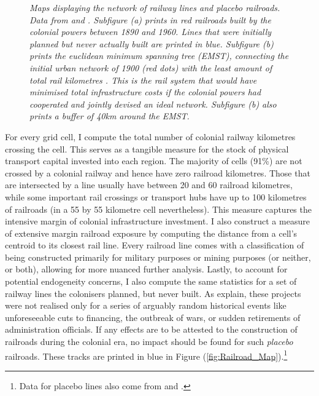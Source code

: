 \documentclass[11pt, oneside]{article}   	%
\let\oldref\ref
\renewcommand{\ref}[1]{(\oldref{#1})}
\newcommand{\mysubcaption}[1]{
\justify
\begin{spacing}{0.7}
\textit{\footnotesize #1}
\end{spacing}}
\begin{document}
\begin{figure}
\label{fig:Rail Maps}
\mysubcaption{Maps displaying the network of railway lines and placebo railroads. Data from \cite{Jedwab_PermanentEffectsTransportation_2016a} and \cite{Herranz-Loncan_publicbenefitRailways_2017}. Subfigure (a) prints in red  railroads built by the colonial powers between 1890 and 1960. Lines that were initially planned but never actually built are printed in blue. Subfigure (b) prints the euclidean minimum spanning tree (EMST), connecting the initial urban network of 1900 (red dots) with the least amount of total rail kilometres \citep[see ][]{Jedwab_PermanentEffectsTransportation_2016a}. This is the rail system that would have minimised total infrastructure costs if the colonial powers had cooperated and jointly devised an ideal network. Subfigure (b) also prints a buffer of 40km around the EMST.}
\end{figure}

For every grid cell, I compute the total number of colonial railway kilometres crossing the cell. This serves as a tangible measure for the stock of physical transport capital invested into each region. The majority of cells (91\%) are not crossed by a colonial railway and hence have zero railroad kilometres. Those that are intersected by a line usually have between 20 and 60 railroad kilometres, while some important rail crossings or transport hubs have up to 100 kilometres of railroads (in a 55 by 55 kilometre cell nevertheless). This measure captures the intensive margin of colonial infrastructure investment. I also construct a measure of extensive margin railroad exposure by computing the distance from a cell's centroid to its closest rail line. Every railroad line comes with a classification of being constructed primarily for military purposes or mining purposes (or neither, or both), allowing for more nuanced further analysis. Lastly, to account for potential endogeneity concerns, I also compute the same statistics for a set of railway lines the colonisers planned, but never built. As \cite{Jedwab_PermanentEffectsTransportation_2016a} explain, these projects were not realised only for a series of arguably random historical events like unforeseeable cuts to financing, the outbreak of wars, or sudden retirements of administration officials. If any effects are to be attested to the construction of railroads during the colonial era, no impact should be found for such \emph{placebo} railroads. These tracks are printed in blue in Figure \ref{fig:Railroad_Map}.\footnote{Data for placebo lines also come from \cite{Jedwab_PermanentEffectsTransportation_2016a} and \cite{Herranz-Loncan_publicbenefitRailways_2017}.}
\end{document}

